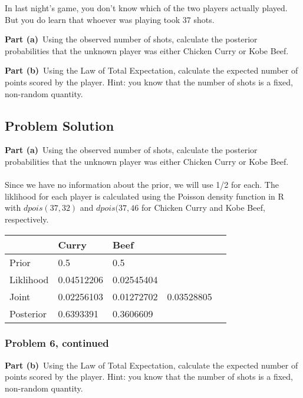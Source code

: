 \documentclass[12pt]{article}
\theoremstyle{definition}
\begin{document}
\bigskip
In last night's game, you don't know which of the two players actually played. But you do learn that whoever was playing took 37 shots. 

\bigskip
\noindent
{\bf Part (a)}\ Using the observed number of shots, calculate the posterior probabilities that the unknown player was either Chicken Curry or Kobe Beef.

\bigskip
\noindent
{\bf Part (b)}\ Using the Law of Total Expectation, calculate the expected number of points scored by the player. Hint: you know that the number of shots is a fixed, non-random quantity.

\newpage
\subsection*{Problem Solution}

\noindent
{\bf Part (a)}\ Using the observed number of shots, calculate the posterior probabilities that the unknown player was either Chicken Curry or Kobe Beef.\\\\

Since we have no information about the prior, we will use 1/2 for each. The liklihood for each player is calculated using the Poisson density function in R with $dpois(37, 32)$ and $dpois(37, 46$ for Chicken Curry and Kobe Beef, respectively.\\
\begin{tabular}{lllll}
&   Curry   &   Beef   \\
\hline
Prior      &   0.5   &   0.5   &\\
Liklihood  &   0.04512206   &   0.02545404   &\\
Joint      &   0.02256103   &   0.01272702   &   0.03528805\\
Posterior  &   0.6393391   &   0.3606609   &\\
\hline
\end{tabular}


\newpage
\subsubsection*{Problem 6, continued}

\noindent
{\bf Part (b)}\ Using the Law of Total Expectation, calculate the expected number of points scored by the player. Hint: you know that the number of shots is a fixed, non-random quantity.\\\\
\end{document}
